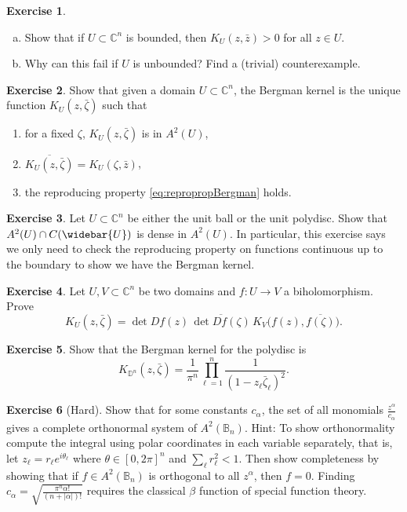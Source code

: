 \documentclass[12pt,openany]{book}
\newcommand{\abs}[1]{\left\lvert {#1} \right\rvert}
\newcommand{\C}{{\mathbb{C}}}
\newcommand{\D}{{\mathbb{D}}}
\newcommand{\bB}{{\mathbb{B}}}
\theoremstyle{plain}
\theoremstyle{remark}
\theoremstyle{definition}
\newenvironment{exbox}{%
    \def\FrameCommand{\vrule width 1pt \relax\hspace{10pt}}%
    \MakeFramed{\advance\hsize-\width\FrameRestore}%
}{%
    \endMakeFramed
}
\newenvironment{exparts}{%
    \leavevmode\begin{enumerate}[a),noitemsep,topsep=0pt,parsep=0pt,partopsep=0pt]
}{%
    \end{enumerate}
}
\newenvironment{exnumparts}{%
    \leavevmode\begin{enumerate}[1),noitemsep,topsep=0pt,parsep=0pt,partopsep=0pt]
}{%
    \end{enumerate}
}
\theoremstyle{exercise}
\newtheorem{exercise}{Exercise}[section]
\theoremstyle{example}
\begin{document}
\begin{exbox}
\begin{exercise}
\begin{exparts}
\item
Show that if $U \subset \C^n$ is bounded, then
$K_U(z,\bar{z}) > 0$
for all $z \in U$.
\item
Why can this fail if $U$ is unbounded?
Find a (trivial) counterexample.
\end{exparts}
\end{exercise}

\begin{exercise}
Show that given a domain $U \subset \C^n$, the Bergman kernel is the unique
function $K_U(z,\bar{\zeta})$ such that
\begin{exnumparts}
\item
for a fixed $\zeta$, $K_U(z,\bar{\zeta})$ is in $A^2(U)$,
\item
$\overline{K_U(z,\bar{\zeta})} =
K_U(\zeta,\bar{z})$,
\item
the reproducing property \eqref{eq:repropropBergman}
holds.
\end{exnumparts}
\end{exercise}

\begin{exercise}
Let $U \subset \C^n$ be either the unit ball or the unit polydisc.
Show that
$A^2(U) \cap C(\widebar{U})$ is dense in $A^2(U)$.  In particular, this
exercise says we
only need to check the reproducing property on functions continuous up to
the boundary to show we have the Bergman kernel.
\end{exercise}

\begin{exercise}
Let $U, V \subset \C^n$ be two domains and $f \colon U \to V$ a
biholomorphism.  Prove
\begin{equation*}
K_U(z,\bar{\zeta}) = \det D f(z) \, \overline{\det D f (\zeta)} \,
K_V\bigl(f(z),\overline{f(\zeta)}\bigr) .
\end{equation*}
\end{exercise}

\begin{exercise}
Show that the Bergman kernel for the polydisc is
\begin{equation*}
K_{\D^n}(z,\bar{\zeta}) =
\frac{1}{\pi^n} \prod_{\ell=1}^n \frac{1}{{(1-z_\ell\bar{\zeta}_\ell)}^2}.
\end{equation*}
\end{exercise}

\begin{exercise}[Hard]
Show that for
some constants $c_\alpha$,
the set of all monomials $\frac{z^\alpha}{c_\alpha}$ gives a complete orthonormal
system of $A^2(\bB_n)$.  Hint: To show orthonormality
compute the integral using polar coordinates in each variable
separately, that is, let $z_\ell = r_\ell e^{i\theta_\ell}$ where $\theta \in
[0,2\pi]^n$ and $\sum_\ell r_\ell^2 < 1$.  Then show completeness by showing that
if $f \in A^2(\bB_n)$ is orthogonal to all $z^\alpha$, then $f = 0$.
Finding $c_\alpha = \sqrt{\frac{\pi^n \alpha!}{(n+\abs{\alpha})!}}$ requires
the classical $\beta$ function of special function theory.
\end{exercise}


\end{exbox}
\end{document}
